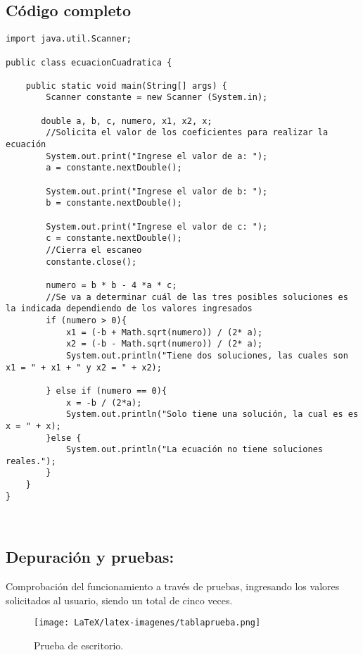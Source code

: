 \subsection{Código completo}
\begin{lstlisting}[style=javaStyle]
import java.util.Scanner;

public class ecuacionCuadratica {

    public static void main(String[] args) {
        Scanner constante = new Scanner (System.in); 
        
       double a, b, c, numero, x1, x2, x;
        //Solicita el valor de los coeficientes para realizar la ecuación
        System.out.print("Ingrese el valor de a: ");
        a = constante.nextDouble();
        
        System.out.print("Ingrese el valor de b: ");
        b = constante.nextDouble();
        
        System.out.print("Ingrese el valor de c: ");
        c = constante.nextDouble();
        //Cierra el escaneo
        constante.close();
        
        numero = b * b - 4 *a * c;
        //Se va a determinar cuál de las tres posibles soluciones es la indicada dependiendo de los valores ingresados
        if (numero > 0){
            x1 = (-b + Math.sqrt(numero)) / (2* a);
            x2 = (-b - Math.sqrt(numero)) / (2* a);
            System.out.println("Tiene dos soluciones, las cuales son x1 = " + x1 + " y x2 = " + x2);
            
        } else if (numero == 0){
            x = -b / (2*a);
            System.out.println("Solo tiene una solución, la cual es es x = " + x);
        }else {
            System.out.println("La ecuación no tiene soluciones reales.");
        }
    }
}



\end{lstlisting}
\subsection{\textbf{Depuración y pruebas:}}
Comprobación del funcionamiento a través de pruebas, ingresando los valores solicitados al usuario, siendo un total de cinco veces.
\begin{figure}[!ht]
\centering
\texttt{[image: LaTeX/latex-imagenes/tablaprueba.png]}
\caption{Prueba de escritorio.}
\label{fig:diagrama_flujo}
\end{figure}